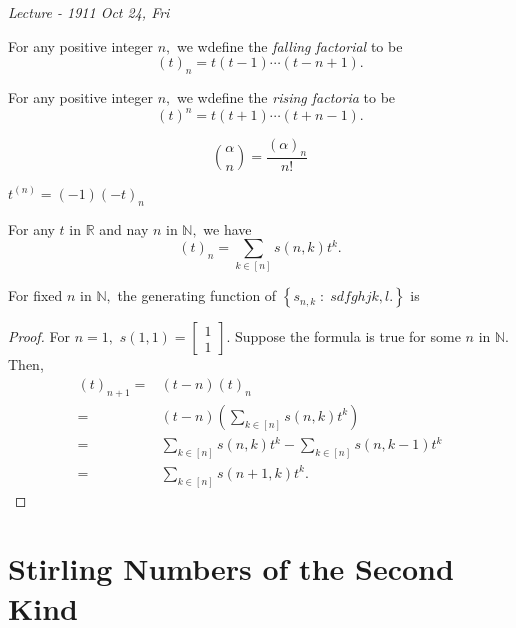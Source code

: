 

\noindent
\emph{Lecture - 19\hfill 11 Oct 24, Fri}

\begin{definition}
	For any positive integer $n,$ we wdefine the \emph{falling factorial} to be 
	$$ (t)_n = t(t-1) \cdots (t - n+1).$$
\end{definition}


\begin{definition}
	For any positive integer $n,$ we wdefine the \emph{rising factoria} to be 
	$$ (t)^n = t(t+1) \cdots (t + n-1).$$
\end{definition}


\begin{remark}
	$$\binom{ \alpha } {n} = \frac{( \alpha)_n}{n!} $$
\end{remark}

\begin{remark}
	$ t^{(n)} = (-1) (-t)_n $
\end{remark}


\begin{theorem}
	For any $t$ in $\mathbb{R}$ and nay $n $ in $\mathbb{N},$ we have
	$$(t)_n = \sum_{k \in [n]} s(n,k) t^k. $$
\end{theorem}

\begin{remark}
	For fixed $n$ in $\mathbb{N},$ the generating function of 
	$\left\{ s_{n,k} \;:\; sdfghjk,l.  \right\} $ is 
\end{remark}
\begin{proof}
	For $n=1,$ $s(1,1) = 
	\begin{bmatrix} 1\\1 \end{bmatrix}.$
Suppose the formula is true for some $n$ in $\mathbb{N}.$ Then,
\begin{align*}
	(t)_{n+1}
	={}& (t-n) (t)_n \\
	={}& (t-n) \left( \sum_{k \in [n]} s(n,k) t^k \right)  \\
	={}& \sum_{k \in [n]} s(n,k) t^k - \sum_{k \in [n]} s(n,k-1) t^k  \\
	={}& \sum_{k \in [n]} s(n+1,k) t^k.
\end{align*}
\end{proof}



\section{Stirling Numbers of the Second Kind}

